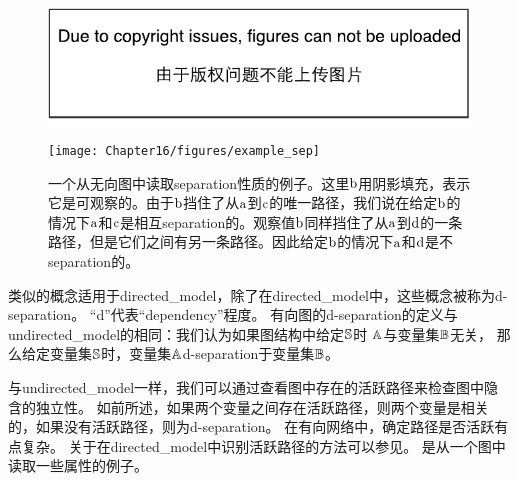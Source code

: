 \begin{figure}[!htb]
\ifOpenSource
\centerline{\includegraphics{figure.pdf}}
\else
	\centerline{\texttt{[image: Chapter16/figures/example\_sep]}}
\fi
	\caption{一个从无向图中读取\gls{separation}性质的例子。这里$\mathrm{b}$用阴影填充，表示它是可观察的。由于$\mathrm{b}$挡住了从$\mathrm{a}$到$\mathrm{c}$的唯一路径，我们说在给定$\mathrm{b}$的情况下$\mathrm{a}$和$\mathrm{c}$是相互\gls{separation}的。观察值$\mathrm{b}$同样挡住了从$\mathrm{a}$到$\mathrm{d}$的一条路径，但是它们之间有另一条路径。因此给定$\mathrm{b}$的情况下$\mathrm{a}$和$\mathrm{d}$是不\gls{separation}的。}
	\label{fig:example_sep}
\end{figure}



类似的概念适用于\gls{directed_model}，除了在\gls{directed_model}中，这些概念被称为d-\gls{separation}。
``d''代表``\gls{dependency}''程度。
有向图的d-\gls{separation}的定义与\gls{undirected_model}的相同：我们认为如果图结构中给定$\mathbb{S}$时 $\mathbb{A}$与变量集$\mathbb{B}$无关，
那么给定变量集$\mathbb{S}$时，变量集$\mathbb{A}$d-\gls{separation}于变量集$\mathbb{B}$。


与\gls{undirected_model}一样，我们可以通过查看图中存在的活跃路径来检查图中隐含的独立性。
如前所述，如果两个变量之间存在活跃路径，则两个变量是相关的，如果没有活跃路径，则为d-\gls{separation}。
在有向网络中，确定路径是否活跃有点复杂。
关于在\gls{directed_model}中识别活跃路径的方法可以参见。 
是从一个图中读取一些属性的例子。


